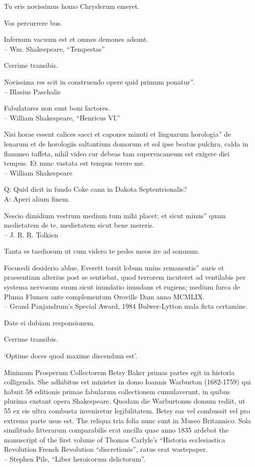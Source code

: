 \documentclass[titlepage,12pt]{memoir}
\begin{document}
Tu eris novissimus homo Chryslerum emeret.

Vos percurrere bus.

Infernum vacuum est et omnes demones adsunt.
\\-- Wm. Shakespeare, “Tempestas”

Cerrime transibis.

Novissima res scit in construendo opere quid primum ponatur”.
\\-- Blasius Paschalis

Fabulatores non sunt boni factores.
\\-- William Shakespeare, “Henricus VI.”

Nisi horae essent calices sacci et capones minuti et linguarum horologia”
de lenarum et de horologiis saltantium domorum et sol ipse beatus
pulchra, calda in flammeo taffeta, nihil video cur debeas
tam supervacaneum est exigere diei tempus. Et nunc vastata est
tempus terere me.
\\-- William Shakespeare

Q: Quid dicit in fundo Coke cann in Dakota Septentrionalis?\\
A: Aperi alium finem.

Nescio dimidium vestrum medium tum mihi placet; et sicut minus”
quam medietatem de te, medietatem sicut bene mereris.
\\-- J. R. R. Tolkien

Tanta es taediosum ut cum videro te pedes meos ire ad somnum.

Focusedi desiderio ablue, Everett torsit lobum unius remanentis”
auris et praesentiam alterius post se sentiebat, quod terrorem incuteret
ad ventilabis per systema nervosum suum sicut inundatio inundans et rugiens;
medium furca de Pluma Flumen ante complementum Oroville Dam
anno MCMLIX.
\\-- Grand Panjandrum’s Special Award, 1984 Bulwer-Lytton
mala ficta certamine.

Date ei dubiam responsionem.

Cerrime transibis.

‘Optime doces quod maxime discendum est’.

Minimum Prosperum Collectorem
Betsy Baker primas partes egit in historia colligenda. She
adhibitus est minister in domo Ioannis Warburton (1682-1759) qui habuit
58 editionis primae fabularum collectionem cumulaverunt, in quibus plurima exstant
opera Shakespeare.
Quodam die Warburtonus domum rediit, ut 55 ex eis ultra combusta inveniretur
legibilitatem. Betsy eas vel combussit vel pro extrema parte usus est. The
reliqua tria folia nunc sunt in Museo Britannico.
Sola similitudo litterarum comparabilis erat ancilla quae anno 1835 ardebat
the manuscript of the first volume of Thomas Carlyle’s “Historia ecclesiastica
Revolution French Revolution “discretionis”, ratus erat wastepaper.
\\-- Stephen Pile, “Liber heroicorum delictorum”.
\end{document}
